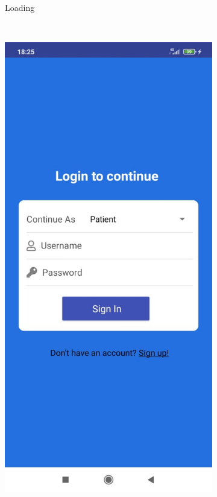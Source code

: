 \begin{figure}
\begin{subfigure}[b]{0.125\textwidth}
        \caption{Loading}
        \label{fig:icon}
    \end{subfigure}
    ~ %
    \begin{subfigure}[b]{0.125\textwidth}
        \includegraphics[width=\textwidth]{figs/mobapp/img2.jpeg}

\end{subfigure}
\end{figure}
